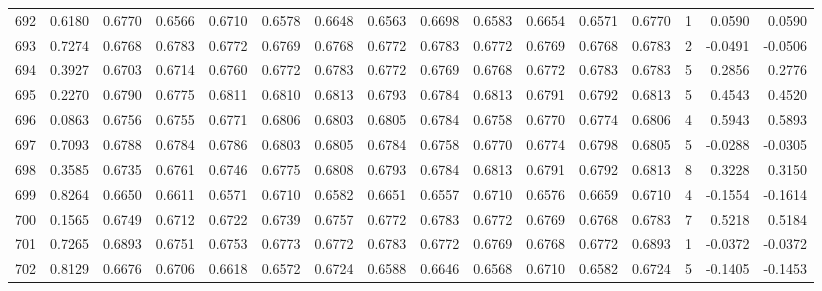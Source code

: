 \begin{tabular}{lrrrrrrrrrrrrrrr}
692 &      0.6180 &  0.6770 &  0.6566 &  0.6710 &  0.6578 &  0.6648 &  0.6563 &  0.6698 &  0.6583 &  0.6654 &   0.6571 &     0.6770 &      1 &                    0.0590 &                     0.0590 \\
693 &      0.7274 &  0.6768 &  0.6783 &  0.6772 &  0.6769 &  0.6768 &  0.6772 &  0.6783 &  0.6772 &  0.6769 &   0.6768 &     0.6783 &      2 &                   -0.0491 &                    -0.0506 \\
694 &      0.3927 &  0.6703 &  0.6714 &  0.6760 &  0.6772 &  0.6783 &  0.6772 &  0.6769 &  0.6768 &  0.6772 &   0.6783 &     0.6783 &      5 &                    0.2856 &                     0.2776 \\
695 &      0.2270 &  0.6790 &  0.6775 &  0.6811 &  0.6810 &  0.6813 &  0.6793 &  0.6784 &  0.6813 &  0.6791 &   0.6792 &     0.6813 &      5 &                    0.4543 &                     0.4520 \\
696 &      0.0863 &  0.6756 &  0.6755 &  0.6771 &  0.6806 &  0.6803 &  0.6805 &  0.6784 &  0.6758 &  0.6770 &   0.6774 &     0.6806 &      4 &                    0.5943 &                     0.5893 \\
697 &      0.7093 &  0.6788 &  0.6784 &  0.6786 &  0.6803 &  0.6805 &  0.6784 &  0.6758 &  0.6770 &  0.6774 &   0.6798 &     0.6805 &      5 &                   -0.0288 &                    -0.0305 \\
698 &      0.3585 &  0.6735 &  0.6761 &  0.6746 &  0.6775 &  0.6808 &  0.6793 &  0.6784 &  0.6813 &  0.6791 &   0.6792 &     0.6813 &      8 &                    0.3228 &                     0.3150 \\
699 &      0.8264 &  0.6650 &  0.6611 &  0.6571 &  0.6710 &  0.6582 &  0.6651 &  0.6557 &  0.6710 &  0.6576 &   0.6659 &     0.6710 &      4 &                   -0.1554 &                    -0.1614 \\
700 &      0.1565 &  0.6749 &  0.6712 &  0.6722 &  0.6739 &  0.6757 &  0.6772 &  0.6783 &  0.6772 &  0.6769 &   0.6768 &     0.6783 &      7 &                    0.5218 &                     0.5184 \\
701 &      0.7265 &  0.6893 &  0.6751 &  0.6753 &  0.6773 &  0.6772 &  0.6783 &  0.6772 &  0.6769 &  0.6768 &   0.6772 &     0.6893 &      1 &                   -0.0372 &                    -0.0372 \\
702 &      0.8129 &  0.6676 &  0.6706 &  0.6618 &  0.6572 &  0.6724 &  0.6588 &  0.6646 &  0.6568 &  0.6710 &   0.6582 &     0.6724 &      5 &                   -0.1405 &                    -0.1453 \\

\end{tabular}
